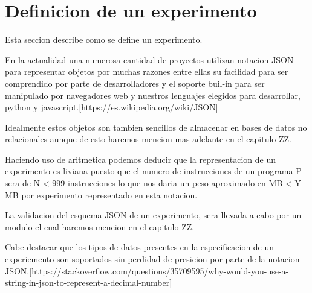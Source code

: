 \section{Definicion de un experimento}

Esta seccion describe como se define un experimento.

En la actualidad una numerosa cantidad de proyectos utilizan notacion JSON para representar
objetos por muchas razones entre ellas su facilidad para ser comprendido por parte de desarrolladores
y el soporte buil-in para ser manipulado por navegadores web y nuestros lenguajes elegidos para
desarrollar, python y javascript.[https://es.wikipedia.org/wiki/JSON]

Idealmente estos objetos son tambien sencillos de almacenar en bases de datos no relacionales
aunque de esto haremos mencion mas adelante en el capitulo ZZ.

Haciendo uso de aritmetica podemos deducir que la representacion de un experimento
es liviana puesto que el numero de instrucciones de un programa P sera de N < 999 instrucciones
lo que nos daria un peso aproximado en MB < Y MB por experimento representado en esta notacion.

La validacion del esquema JSON de un experimento, sera llevada a cabo por un modulo el cual haremos
mencion en el capitulo ZZ. 

Cabe destacar que los tipos de datos presentes en la especificacion de un experiemento son
soportados sin perdidad de presicion por parte de la notacion JSON.[https://stackoverflow.com/questions/35709595/why-would-you-use-a-string-in-json-to-represent-a-decimal-number]


